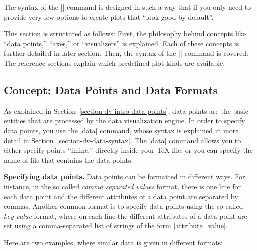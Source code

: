 The syntax of the |\datavisualization| command is designed in such a
way that if you only need to provide very few options to create plots
that ``look good by default''. 

This section is structured as follows: First, the philosophy behind
concepts like ``data points,'' ``axes,'' or ``visualizers'' is
explained. Each of these concepts is further detailed in later
section. Then, the syntax of the |\datavisualization| command is 
covered. The reference sections explain which predefined plot kinds
are available.


\subsection{Concept: Data Points and Data Formats}

As explained in Section~\ref{section-dv-intro-data-points}, data
points are the basic entities that are processed by the data
visualization engine. In order to specify data points, you use the
|data| command, whose syntax is explained in more detail in
Section~\ref{section-dv-data-syntax}. The |data| command allows you to
either specify points ``inline,'' directly inside your \TeX-file; or
you can specify the name of file that contains the data points.

\medskip
\textbf{Specifying data points.}
Data points can be formatted in different ways. For instance, in the so
called \emph{comma separated values} format, there is one line for
each data point and the different attributes of a data point are
separated by commas. Another common format is to specify data points
using the so called \emph{key-value} format, where on each line the
different attributes of a data point are set using a comma-separated
list of strings of the form |attribute=value|.

Here are two examples, where similar data is given in different
formats: 

    \begin{codeexample}[]
    \end{codeexample}
    
    \begin{codeexample}[]
    \end{codeexample}
    
